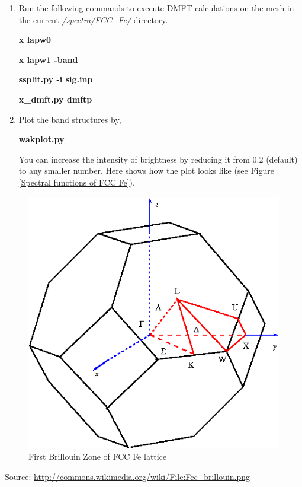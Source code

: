 \documentclass[12 pt]{article}
\begin{document}
\begin{enumerate}
    \item Run the following commands to execute DMFT calculations on the mesh in the current \emph{/spectra/FCC\_Fe/}
 directory.

  \textbf{x lapw0}

  \textbf{x lapw1 -band}

  \textbf{ssplit.py -i sig.inp}

  \textbf{x\_dmft.py dmftp}

    \item Plot the band structures by,

  \textbf{wakplot.py}

  You can increase the intensity of brightness by reducing it from 0.2 (default) to any smaller number. Here shows 
how the plot looks like (see Figure \ref{Spectral functions of FCC Fe}),
 
  \end{enumerate}

  \cleardoublepage

  \begin{figure}[ht]
    \centering
    \caption{First Brillouin Zone of FCC Fe lattice}
    \label{First Brillouin Zone of FCC Fe lattice}
    \vspace{2ex}
    \includegraphics[scale=0.43]{FCC_Fe_brillouin}
  \end{figure}

  Source: \url{http://commons.wikimedia.org/wiki/File:Fcc_brillouin.png}
\end{document}
